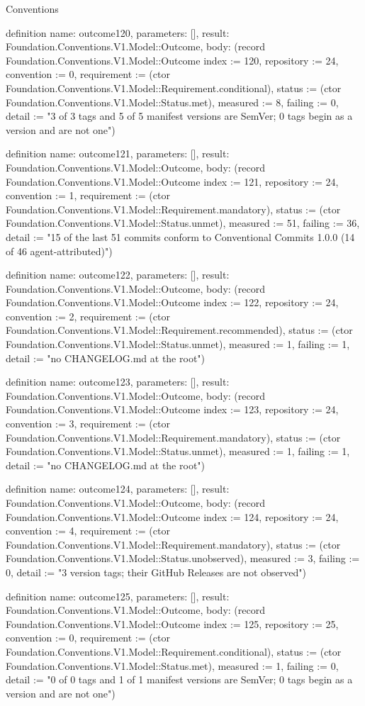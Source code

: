 \begin{lexlean}{Conventions}
\begin{semanticmodule}
definition{
  name: outcome120,
  parameters: [],
  result: Foundation.Conventions.V1.Model::Outcome,
  body: (record Foundation.Conventions.V1.Model::Outcome {index := 120, repository := 24, convention := 0, requirement := (ctor Foundation.Conventions.V1.Model::Requirement.conditional), status := (ctor Foundation.Conventions.V1.Model::Status.met), measured := 8, failing := 0, detail := "3 of 3 tags and 5 of 5 manifest versions are SemVer; 0 tags begin as a version and are not one"})
}

definition{
  name: outcome121,
  parameters: [],
  result: Foundation.Conventions.V1.Model::Outcome,
  body: (record Foundation.Conventions.V1.Model::Outcome {index := 121, repository := 24, convention := 1, requirement := (ctor Foundation.Conventions.V1.Model::Requirement.mandatory), status := (ctor Foundation.Conventions.V1.Model::Status.unmet), measured := 51, failing := 36, detail := "15 of the last 51 commits conform to Conventional Commits 1.0.0 (14 of 46 agent-attributed)"})
}

definition{
  name: outcome122,
  parameters: [],
  result: Foundation.Conventions.V1.Model::Outcome,
  body: (record Foundation.Conventions.V1.Model::Outcome {index := 122, repository := 24, convention := 2, requirement := (ctor Foundation.Conventions.V1.Model::Requirement.recommended), status := (ctor Foundation.Conventions.V1.Model::Status.unmet), measured := 1, failing := 1, detail := "no CHANGELOG.md at the root"})
}

definition{
  name: outcome123,
  parameters: [],
  result: Foundation.Conventions.V1.Model::Outcome,
  body: (record Foundation.Conventions.V1.Model::Outcome {index := 123, repository := 24, convention := 3, requirement := (ctor Foundation.Conventions.V1.Model::Requirement.mandatory), status := (ctor Foundation.Conventions.V1.Model::Status.unmet), measured := 1, failing := 1, detail := "no CHANGELOG.md at the root"})
}

definition{
  name: outcome124,
  parameters: [],
  result: Foundation.Conventions.V1.Model::Outcome,
  body: (record Foundation.Conventions.V1.Model::Outcome {index := 124, repository := 24, convention := 4, requirement := (ctor Foundation.Conventions.V1.Model::Requirement.mandatory), status := (ctor Foundation.Conventions.V1.Model::Status.unobserved), measured := 3, failing := 0, detail := "3 version tags; their GitHub Releases are not observed"})
}

definition{
  name: outcome125,
  parameters: [],
  result: Foundation.Conventions.V1.Model::Outcome,
  body: (record Foundation.Conventions.V1.Model::Outcome {index := 125, repository := 25, convention := 0, requirement := (ctor Foundation.Conventions.V1.Model::Requirement.conditional), status := (ctor Foundation.Conventions.V1.Model::Status.met), measured := 1, failing := 0, detail := "0 of 0 tags and 1 of 1 manifest versions are SemVer; 0 tags begin as a version and are not one"})
}


\end{semanticmodule}
\end{lexlean}
